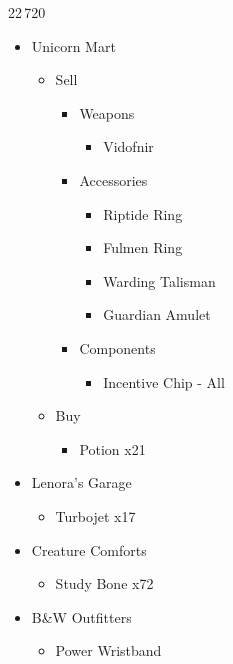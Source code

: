 \begin{shop}{22\,720}
\begin{itemize}
    \item Unicorn Mart
    \begin{itemize}
        \item Sell
        \begin{itemize}
            \item Weapons
            \begin{itemize}
                \item Vidofnir
            \end{itemize}
            \item Accessories
            \begin{itemize}
                \item Riptide Ring
                \item Fulmen Ring
                \item Warding Talisman
                \item Guardian Amulet
            \end{itemize}
            \item Components
            \begin{itemize}
                \item Incentive Chip - All
            \end{itemize}
        \end{itemize}
        \item Buy
        \begin{itemize}
            \item Potion x21
        \end{itemize}
    \end{itemize}
    \item Lenora's Garage
    \begin{itemize}
        \item Turbojet x17
    \end{itemize}
    \item Creature Comforts
    \begin{itemize}
        \item Study Bone x72
    \end{itemize}
    \item B\&W Outfitters
    \begin{itemize}
        \item Power Wristband
    \end{itemize}
\end{itemize}
\end{shop}
